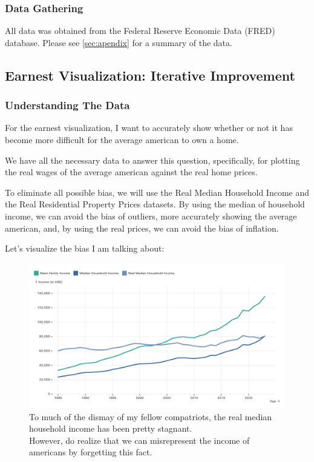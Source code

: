 \documentclass{article}
\begin{document}
\subsubsection{Data Gathering}

All data was obtained from the Federal Reserve Economic Data (FRED) database. 
Please see \autoref{sec:apendix} for a summary of the data.

\subsection{Earnest Visualization: Iterative Improvement}
\subsubsection{Understanding The Data}

For the earnest visualization, I want to accurately show whether or not it has become
more difficult for the average american to own a home. 

We have all the necessary data to answer this question, specifically, for plotting the
real wages of the average american against the real home prices.

To eliminate all possible bias, we will use the Real Median Household Income 
and the Real Residential Property Prices datasets. By using the median of household income,
we can avoid the bias of outliers, more accurately showing the average american, 
and, by using the real prices, we can avoid the bias of inflation. 

Let's visualize the bias I am talking about:

\begin{figure}[ht] 
  \centering
  \includegraphics[width=.90\textwidth]{figs/income.png}
  \caption{
      To much of the dismay of my fellow compatriots, the real median household income has been pretty stagnant. \\
      However, do realize that we can misrepresent the income of americans by forgetting this fact.
  }
  \label{fig:income}
\end{figure}
\end{document}
